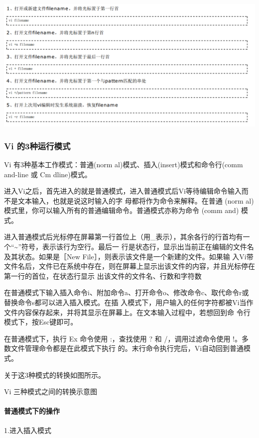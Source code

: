 \documentclass[letterpaper,10pt]{sphinxmanual}
\begin{document}
\includegraphics{vi.png}


\subsubsection{Vi 的3种运行模式}
\label{Linux_vim/command:vi-3}
Vi 有3种基本工作模式：普通(norm al)模式、插入(insert)模式和命令行(comm and-line 或 Cm dline)模式。

进入Vi之后，首先进入的就是普通模式，进入普通模式后Vi等待编辑命令输入而不是文本输入，也就是说这时输入的字
母都将作为命令来解释。在普通 (norm al) 模式里，你可以输入所有的普通编辑命令。普通模式亦称为命令
(comm and) 模式。

进入普通模式后光标停在屏幕第一行首位上（用\_表示），其余各行的行首均有一个“\textasciitilde{}”符号，表示该行为空行。最后一
行是状态行，显示出当前正在编辑的文件名及其状态。如果是［New File］，则表示该文件是一个新建的文件。如果输
入Vi带文件名后，文件已在系统中存在，则在屏幕上显示出该文件的内容，并且光标停在第一行的首位，在状态行显示
出该文件的文件名、行数和字符数

在普通模式下输入插入命令i、附加命令a、打开命令o、修改命令c、取代命令r或替换命令s都可以进入插入模式。在插
入模式下，用户输入的任何字符都被Vi当作文件内容保存起来，并将其显示在屏幕上。在文本输入过程中，若想回到命
令行模式下，按Esc键即可。

在普通模式下，执行 Ex 命令使用 :，查找使用 ? 和 /，调用过滤命令使用 !。多数文件管理命令都是在此模式下执行
的。末行命令执行完后，Vi自动回到普通模式。

关于这3种模式的转换如图所示。

Vi 三种模式之间的转换示意图


\paragraph{普通模式下的操作}
\label{Linux_vim/command:id3}
1.进入插入模式
\end{document}
